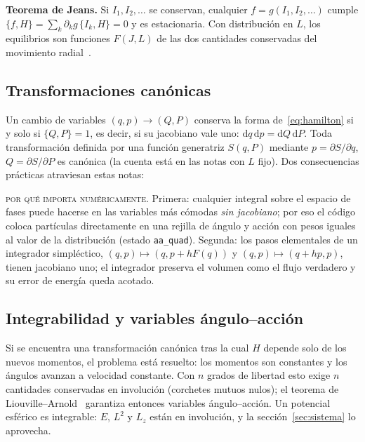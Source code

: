 \documentclass[11pt,a4paper]{article}
\newcommand{\dd}{\mathrm{d}}
\begin{document}
\begin{idea}
\textbf{Teorema de Jeans.} Si $I_1,I_2,\dots$ se conservan, cualquier
$f=g(I_1,I_2,\dots)$ cumple $\{f,H\}=\sum_k\partial_kg\,\{I_k,H\}=0$ y es estacionaria.
Con distribución en $L$, los equilibrios son funciones $F(J,L)$ de las dos cantidades
conservadas del movimiento radial~\cite[\S4.2]{binney2008}.
\end{idea}

\subsection{Transformaciones canónicas}

Un cambio de variables $(q,p)\to(Q,P)$ conserva la forma de~\eqref{eq:hamilton} si y
solo si $\{Q,P\}=1$, es decir, si su jacobiano vale uno:
$\dd q\,\dd p=\dd Q\,\dd P$. Toda transformación definida por una función generatriz
$S(q,P)$ mediante $p=\partial S/\partial q$, $Q=\partial S/\partial P$ es canónica (la
cuenta está en las notas con $L$ fijo). Dos consecuencias prácticas atraviesan estas
notas:

\begin{aviso}
\textsc{por qué importa numéricamente.} Primera: cualquier integral sobre el espacio de
fases puede hacerse en las variables más cómodas \emph{sin jacobiano}; por eso el código
coloca partículas directamente en una rejilla de ángulo y acción con pesos iguales al
valor de la distribución (estado \texttt{aa\_quad}). Segunda: los pasos elementales de
un integrador simpléctico, $(q,p)\mapsto(q,p+hF(q))$ y $(q,p)\mapsto(q+hp,p)$, tienen
jacobiano uno; el integrador preserva el volumen como el flujo verdadero y su error de
energía queda acotado.
\end{aviso}

\subsection{Integrabilidad y variables ángulo--acción}

Si se encuentra una transformación canónica tras la cual $H$ depende solo de los nuevos
momentos, el problema está resuelto: los momentos son constantes y los ángulos avanzan a
velocidad constante. Con $n$ grados de libertad esto exige $n$ cantidades conservadas en
involución (corchetes mutuos nulos); el teorema de Liouville--Arnold~\cite[\S49]{arnold1989}
garantiza entonces variables ángulo--acción. Un potencial esférico es integrable: $E$,
$L^2$ y $L_z$ están en involución, y la sección~\ref{sec:sistema} lo aprovecha.
\end{document}
